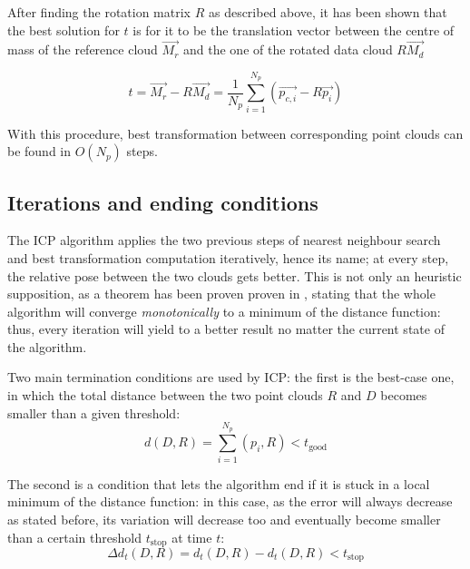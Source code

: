 After finding the rotation matrix $R$ as described above, it has been shown that the best solution for $t$
is for it to be the translation vector between the centre of mass of the
reference cloud $\vec{M_{r}}$ and the one of the rotated
data cloud $R\vec{M_d}$ 

\begin{equation}
  t = \vec{M_r}-R\vec{M_d} =  \frac{1}{N_p}\sum_{i=1}^{N_p}\left(\vec{p_{c,i}}-R\vec{p_{i}}\right) 
\end{equation}

With this procedure, best transformation between corresponding point clouds can
be found in $O(N_p)$ steps.

\subsection{Iterations and ending conditions}
The ICP algorithm applies the two previous steps of nearest neighbour search and
best transformation computation iteratively, hence its name; at every step, the
relative pose between the two clouds gets better. This is not only an heuristic
supposition, as a theorem has been proven
proven in \cite{icp}, stating that the whole algorithm will converge
\emph{monotonically} to a minimum of the distance function: thus, every
iteration will yield to a better result no matter the current state of the
algorithm.

Two main termination conditions are used by ICP: the first is the best-case one,
in which the total distance between the two point clouds $R$ and $D$ becomes smaller than a
given threshold:
\begin{equation}
  d(D,R) = \sum_{i=1}^{N_p}\left(p_i,R\right) < t_{\text{good}}
\end{equation}

The second is a condition that lets the algorithm end if it is stuck in a local
minimum of the distance function: in this case, as the error will always
decrease as stated before, its variation will decrease too and eventually become
smaller than a certain threshold $t_{\text{stop}}$ at time $t$:
\begin{equation}
  \Delta d_t(D,R) = d_t(D,R)-d_t(D,R) < t_{\text{stop}}
\end{equation}

